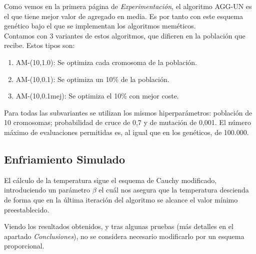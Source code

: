\vspace{\baselineskip}

Como vemos en la primera página de \textit{Experimentación}, el algoritmo AGG-UN es el que tiene mejor valor de agregado en media. Es por tanto con este esquema genético bajo el que se implementan los algoritmos meméticos. \\
Contamos con 3 variantes de estos algoritmos, que difieren en la población que recibe. Estos tipos son:

\begin{enumerate}
    \item AM-(10,1.0): Se optimiza cada cromosoma de la población.
    \item AM-(10,0.1): Se optimiza un 10\% de la población.
    \item AM-(10,0.1mej): Se optimiza el 10\% con mejor coste.
\end{enumerate}

Para todas las subvariantes se utilizan los mismos hiperparámetros: población de 10 cromosomas; probabilidad de cruce de 0,7 y de mutación de 0,001. El número máximo de evaluaciones permitidas es, al igual que en los genéticos, de 100.000.


\subsection{Enfriamiento Simulado}

El cálculo de la temperatura sigue el esquema de Cauchy modificado, introduciendo un parámetro $\beta$ el cuál nos asegura que la temperatura descienda de forma que en la última iteración del algoritmo se alcance el valor mínimo preestablecido. 

\vspace{\baselineskip}

Viendo los resultados obtenidos, y tras algunas pruebas (más detalles en el apartado \textit{Conclusiones}), no se considera necesario modificarlo por un esquema proporcional.

\vspace{\baselineskip}

